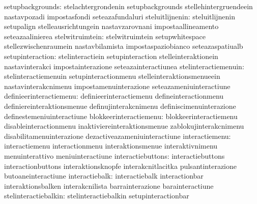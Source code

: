                 setupbackgrounds: stelachtergrondenin              setupbackgrounds
                                  stellehintergruendeein           nastavpozadi
                                  impostasfondi                    seteazafundaluri
                 steluitlijnenin: steluitlijnenin                  setupalign
                                  stelleausrichtungein             nastavzarovnani
                                  impostaallineamento              seteazaalinierea
                 stelwitruimtein: stelwitruimtein                  setupwhitespace
                                  stellezwischenraumein            nastavbilamista
                                  impostaspaziobianco              seteazaspatiualb
                setupinteraction: stelinteractiein                 setupinteraction
                                  stelleinteraktionein             nastavinterakci
                                  impostainterazione               seteazainteractiunea
            stelinteractiemenuin: stelinteractiemenuin             setupinteractionmenu
                                  stelleinteraktionsmenueein       nastavinterakcnimenu
                                  impostamenuinterazione           seteazameniuinteractiune
         definieerinteractiemenu: definieerinteractiemenu          defineinteractionmenu
                                  definiereinteraktionsmenue       definujinterakcnimenu
                                  definiscimenuinterazione         definestemeniuinteractiune
          blokkeerinteractiemenu: blokkeerinteractiemenu           disableinteractionmenu
                                  inaktiviereinteraktionsmenue     zablokujinterakcnimenu
                                  disabilitamenuinterazione        dezactiveazameniuinteractiune
                  interactiemenu: interactiemenu                   interactionmenu
                                  interaktionsmenue                interaktivnimenu
                                  menuinterattivo                  meniuinteractiune
               interactiebuttons: interactiebuttons                interactionbuttons
                                  interaktionsknopfe               interakcnitlacitka
                                  pulsantinterazione               butoaneinteractiune
                  interactiebalk: interactiebalk                   interactionbar
                                  interaktionsbalken               interakcnilista
                                  barrainterazione                 barainteractiune
            stelinteractiebalkin: stelinteractiebalkin             setupinteractionbar
